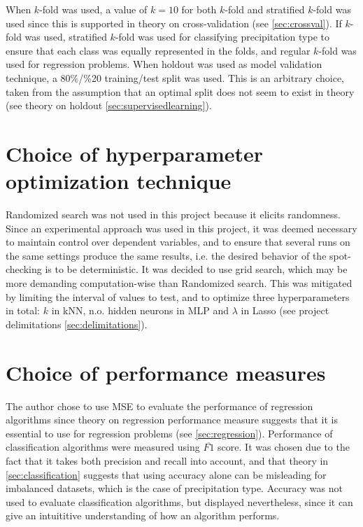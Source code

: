 	When $k$-fold was used, a value of $k= 10$ for both $k$-fold and stratified $k$-fold was used since this is supported in theory on cross-validation (see \ref{sec:crossval}). If $k$-fold was used, stratified $k$-fold was used for classifying precipitation type to ensure that each class was equally represented in the folds, and regular $k$-fold was used for regression problems. When holdout was used as model validation technique, a 80\%/\%20 training/test split was used. This is an arbitrary choice, taken from the assumption that an optimal split does not seem to exist in theory (see theory on holdout   \ref{sec:supervisedlearning}).

\section{Choice of hyperparameter optimization technique} \label{sec:hyper_opt_techniques}
	Randomized search was not used in this project because it elicits randomness. Since an experimental approach was used in this project, it was deemed necessary to maintain control over dependent variables, and to ensure that several runs on the same settings produce the same results, i.e. the desired behavior of the spot-checking is to be deterministic. It was decided to use grid search, which may be more demanding computation-wise than Randomized search. This was mitigated by limiting the interval of values to test, and to optimize three hyperparameters in total: $k$ in kNN, n.o. hidden neurons in MLP and $\lambda$ in Lasso (see project delimitations \ref{sec:delimitations}).

\section{Choice of performance measures}
	The author chose to use MSE to evaluate the performance of regression algorithms since theory on regression performance measure suggests that it is essential to use for regression problems (see \ref{sec:regression}). Performance of classification algorithms were measured using $\overline{F1}$ score. It was chosen due to the fact that it takes both precision and recall into account, and that theory in \ref{sec:classification} suggests that using accuracy alone can be misleading for imbalanced datasets, which is the case of precipitation type. Accuracy was not used to evaluate classification algorithms, but displayed nevertheless, since it can give an intuititive understanding of how an algorithm performs.

